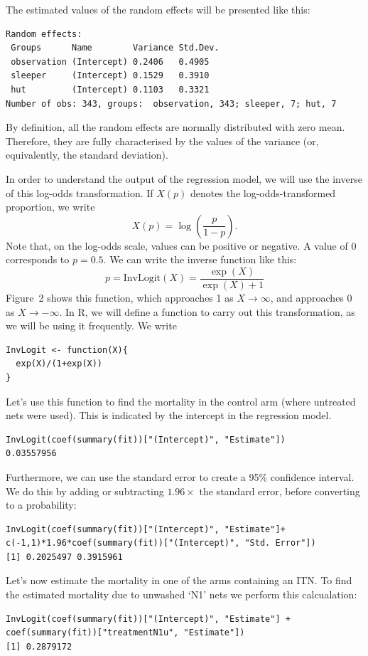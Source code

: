 \documentclass[11pt]{article}
\begin{document}
The estimated values of the random effects will be presented like this:
\begin{verbatim} 
Random effects:
 Groups      Name        Variance Std.Dev.
 observation (Intercept) 0.2406   0.4905  
 sleeper     (Intercept) 0.1529   0.3910  
 hut         (Intercept) 0.1103   0.3321  
Number of obs: 343, groups:  observation, 343; sleeper, 7; hut, 7
\end{verbatim} 
By definition, all the random effects are normally distributed with zero mean. Therefore, they are fully characterised by the values of the variance (or, equivalently, the standard deviation).

In order to understand the output of the regression model, we will use the inverse of this log-odds transformation. If $X(p)$ denotes the log-odds-transformed proportion, we write
\[
X(p) = \log \left( \frac{p}{1-p} \right).
\]
Note that, on the log-odds scale, values can be positive or negative. A value of 0 corresponds to $p=0.5$. We can write the inverse function like this:
\[
p = \textrm{InvLogit}(X) = \frac{\exp(X)}{\exp(X) + 1}
\]
Figure~2 shows this function, which approaches 1 as $X\to\infty$, and approaches 0 as $X\to-\infty$. In R, we will define a function to carry out this transformation, as we will be using it frequently. We write
\begin{verbatim} 
InvLogit <- function(X){
  exp(X)/(1+exp(X))
}
\end{verbatim} 
Let's use this function to find the mortality in the control arm (where untreated nets were used). This is indicated by the intercept in the regression model. 
\begin{verbatim} 
InvLogit(coef(summary(fit))["(Intercept)", "Estimate"])
0.03557956
\end{verbatim} 
Furthermore, we can use the standard error to create a 95\% confidence interval. We do this by adding or subtracting $1.96\times$ the standard error, before converting to a probability: 
\begin{verbatim} 
InvLogit(coef(summary(fit))["(Intercept)", "Estimate"]+
c(-1,1)*1.96*coef(summary(fit))["(Intercept)", "Std. Error"])
[1] 0.2025497 0.3915961
\end{verbatim} 
Let's now estimate the mortality in one of the arms containing an ITN. To find the estimated mortality due to unwashed `N1' nets we perform this calcualation:
\begin{verbatim} 
InvLogit(coef(summary(fit))["(Intercept)", "Estimate"] +
coef(summary(fit))["treatmentN1u", "Estimate"])
[1] 0.2879172
\end{verbatim} 
\end{document}
